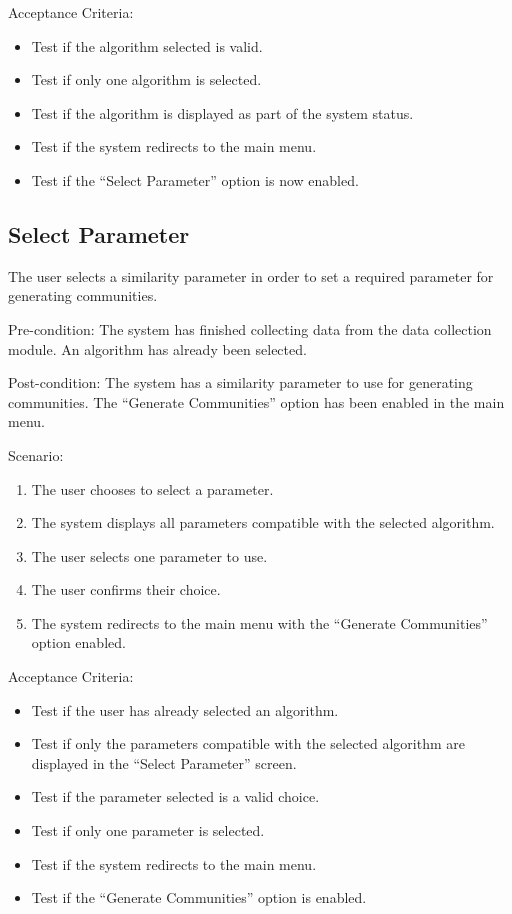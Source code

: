 Acceptance Criteria:
\begin{itemize}
	\item Test if the algorithm selected is valid.
	\item Test if only one algorithm is selected.
	\item Test if the algorithm is displayed as part of the system status.
	\item Test if the system redirects to the main menu.
	\item Test if the ``Select Parameter'' option is now enabled.
\end{itemize}

\subsection{Select Parameter}

The user selects a similarity parameter in order to set a required parameter for generating communities.

Pre-condition: The system has finished collecting data from the data collection module. An algorithm has
already been selected.

Post-condition: The system has a similarity parameter to use for generating communities. The ``Generate Communities'' option
has been enabled in the main menu.

Scenario:
\begin{enumerate}
	\item The user chooses to select a parameter.
	\item The system displays all parameters compatible with the selected algorithm.
	\item The user selects one parameter to use.
	\item The user confirms their choice.
	\item The system redirects to the main menu with the ``Generate Communities'' option enabled.
\end{enumerate}

Acceptance Criteria:
\begin{itemize}
	\item Test if the user has already selected an algorithm.
	\item Test if only the parameters compatible with the selected algorithm are displayed in the ``Select Parameter'' screen.
	\item Test if the parameter selected is a valid choice.
	\item Test if only one parameter is selected.
	\item Test if the system redirects to the main menu.
	\item Test if the ``Generate Communities'' option is enabled.
\end{itemize}


